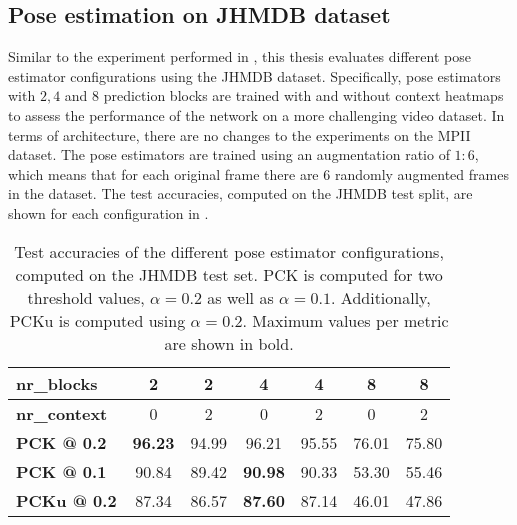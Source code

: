 \subsection{Pose estimation on JHMDB dataset}
Similar to the experiment performed in , this thesis evaluates different pose estimator configurations using the JHMDB dataset.
Specifically, pose estimators with $2, 4$ and $8$ prediction blocks are trained with and without context heatmaps to assess the performance of the network on a more challenging video dataset.
In terms of architecture, there are no changes to the experiments on the MPII dataset.
The pose estimators are trained using an augmentation ratio of $1:6$, which means that for each original frame there are $6$ randomly augmented frames in the dataset.
The test accuracies, computed on the JHMDB test split, are shown for each configuration in .

\begin{table}[]
    \small
    \centering
    \begin{tabular}{|l|c|c|c|c|c|c|}
    \hline
        \textbf{nr\_blocks} & 2 & 2 & 4 & 4 & 8 & 8 \\ \hline
        \textbf{nr\_context} & 0 & 2 & 0 & 2 & 0 & 2 \\ \hline
        \textbf{PCK @ 0.2} & \textbf{96.23} & 94.99 & 96.21 & 95.55 & 76.01 & 75.80 \\ \hline
        \textbf{PCK @ 0.1} & 90.84 & 89.42 & \textbf{90.98} & 90.33 & 53.30 & 55.46 \\ \hline
        \textbf{PCKu @ 0.2} & 87.34 & 86.57 & \textbf{87.60} & 87.14 & 46.01 & 47.86 \\ \hline
    \end{tabular}
    \caption{Test accuracies of the different pose estimator configurations, computed on the JHMDB test set. PCK is computed for two threshold values, $\alpha = 0.2$ as well as $\alpha = 0.1$. Additionally, PCKu is computed using $\alpha = 0.2$. Maximum values per metric are shown in bold.}
    \label{tab:jhmdb_results}
\end{table}


